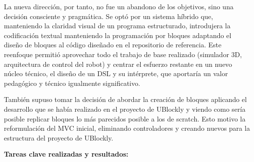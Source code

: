 La nueva dirección, por tanto, no fue un abandono de los objetivos, sino una decisión consciente y pragmática. Se optó por un sistema híbrido que, manteniendo la claridad visual de un programa estructurado, introdujera la codificación textual manteniendo la programación por bloques adaptando el diseño de bloques al código diseñado en el repositorio de referencia. Este reenfoque permitió aprovechar todo el trabajo de base realizado (simulador 3D, arquitectura de control del robot) y centrar el esfuerzo restante en un nuevo núcleo técnico, el diseño de un DSL\cite{DSL}\cite{lenguaje_DSL} y su intérprete, que aportaría un valor pedagógico y técnico igualmente significativo.

También supuso tomar la decisión de abordar la creación de bloques aplicando el desarrollo que se había realizado en el proyecto de UBlockly y viendo como sería posible replicar bloques lo más parecidos posible a los de scratch. Esto motivo la reformulación del MVC inicial, eliminando controladores y creando nuevos para la estructura del proyecto de UBlockly.
\item \textbf{Tareas clave realizadas y resultados:}

